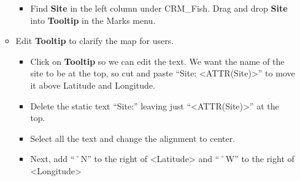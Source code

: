 \documentclass[
]{book}
\providecommand{\tightlist}{%
  \setlength{\itemsep}{0pt}\setlength{\parskip}{0pt}}
\begin{document}
\begin{enumerate}
\begin{itemize}
    \begin{itemize}
    \tightlist
    \item
      Find \textbf{Site} in the left column under CRM\_Fish. Drag and drop \textbf{Site} into \textbf{Tooltip} in the Marks menu.
    \end{itemize}
  \item
    Edit \textbf{Tooltip} to clarify the map for users.

    \begin{itemize}
    \tightlist
    \item
      Click on \textbf{Tooltip} so we can edit the text. We want the name of the site to be at the top, so cut and paste ``Site: \textless ATTR(Site)\textgreater{}'' to move it above Latitude and Longitude.
    \item
      Delete the static text ``Site:'' leaving just ``\textless ATTR(Site)\textgreater{}'' at the top.
    \item
      Select all the text and change the alignment to center.
    \item
      Next, add ``˚N'' to the right of \textless Latitude\textgreater{} and ``˚W'' to the right of \textless Longitude\textgreater{}


\end{itemize}
\end{itemize}
\end{enumerate}
\end{document}
